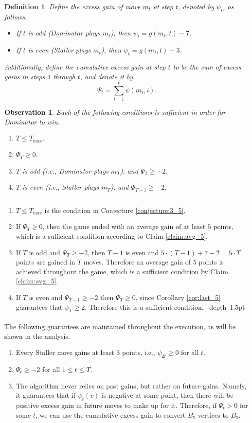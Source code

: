 \documentclass[11pt]{article}
\def\Proof{\par\noindent{\bf Proof:~}}
\def\blackslug{\hbox{\hskip 1pt \vrule width 4pt height 8pt
    depth 1.5pt \hskip 1pt}}
\def\QED{\quad\blackslug\lower 8.5pt\null\par}
\def\dnsitem{\vspace{-7pt}\item}
\newtheorem{definition}[theorem]{Definition}
\newtheorem{observation}[theorem]{Observation}
\theoremstyle{definition}
\begin{document}
\begin{definition}
\label{def:excess_gain}
Define the \emph{excess gain} of move $m_t$ at step $t$, denoted by $\psi_t$, as follows.
\begin{itemize}
	\dnsitem If $t$ is odd (Dominator plays $m_t$), then $\psi_t = g(m_t, t) - 7$.
	\dnsitem If $t$ is even (Staller plays $m_t$), then $\psi_t = g(m_t, t) - 3$.
\end{itemize}
Additionally, define the \emph{cumulative excess gain} at step $t$ to be the sum of excess gains in steps $1$ through $t$, and denote it by 
$$\Psi_t = \sum_{i=1}^{t} \psi(m_{i}, i).$$
\end{definition}

\begin{observation}
\label{obs:sufficient_overhead}
Each of the following conditions is sufficient in order for Dominator to win.
\begin{enumerate}
	\dnsitem $T \leq T_{\max}$.
	\dnsitem $\Psi_T \geq 0$.
	\dnsitem $T$ is odd (i.e., Dominator plays $m_T$), and $\Psi_T \geq -2$.
	\dnsitem $T$ is even (i.e., Staller plays $m_T$), and $\Psi_{T - 1} \geq -2$. 
\end{enumerate}
\end{observation}
\Proof
$ $ 
\begin{enumerate}
	\dnsitem $T \leq T_{\max}$ is the condition in Conjecture \ref{conjecture:3_5}.

	\dnsitem If $\Psi_T \geq 0$, then the game ended with an average gain of at least $5$ points, which is a sufficient condition according to Claim \ref{claim:avg_5}.
	
	\dnsitem If $T$ is odd and $\Psi_T \geq -2$, then $T - 1$ is even and $5 \cdot (T - 1) + 7 - 2 = 5 \cdot T$ points are gained in $T$ moves. Therefore an average gain of $5$ points is achieved throughout the game, which is a sufficient condition by Claim \ref{claim:avg_5}.
	
	\dnsitem If $T$ is even and $\Psi_{T - 1} \geq -2$ then $\Psi_T \geq 0$, since Corollary \ref{cor:last_5} guarantees that $\psi_T \geq 2$. Therefore this is a sufficient condition.
\QED
\end{enumerate}

\paragraph{}
The following guarantees are maintained throughout the execution, as will be shown in the analysis.
\begin{enumerate}
	\dnsitem Every Staller move gains at least $3$ points, i.e., $\psi_{2t} \geq 0$ for all $t$.
	\dnsitem $\Psi_t \geq -2$ for all $1 \leq t \leq T$.
	\dnsitem The algorithm never relies on past gains, but rather on future gains. Namely, it guarantees that if $\psi_t(v)$ is negative at some point, then there will be positive excess gain in future moves to make up for it.
Therefore, if $\Psi_t > 0$ for some $t$, we can use the cumulative excess gain to convert $B_2$ vertices to $B_3$.

\end{enumerate}
\end{document}
